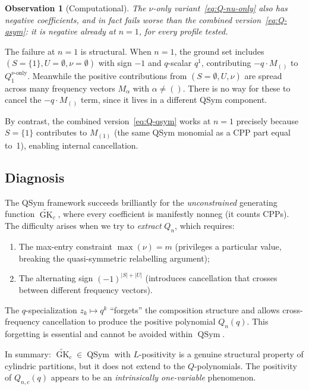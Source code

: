 \documentclass[11pt]{article}
\newtheorem{observation}[theorem]{Observation}
\newcommand{\GK}{\operatorname{GK}}
\newcommand{\QSym}{\operatorname{QSym}}
\begin{document}
\begin{observation}[Computational]\label{obs:nu-only-fails}
The $\nu$-only variant~\eqref{eq:Q-nu-only} also has negative
coefficients, and in fact fails \emph{worse} than the combined
version~\eqref{eq:Q-qsym}: it is negative already at $n = 1$,
for every profile tested.
\end{observation}

The failure at $n = 1$ is structural. When $n = 1$, the ground
set includes $(S = \{1\}, U = \emptyset, \nu = \emptyset)$
with sign $-1$ and $q$-scalar $q^1$, contributing
$-q \cdot M_{()}$ to $Q_1^{\nu\text{-only}}$. Meanwhile the
positive contributions from $(S = \emptyset, U, \nu)$ are spread
across many frequency vectors $M_\alpha$ with $\alpha \neq ()$.
There is no way for these to cancel the $-q \cdot M_{()}$ term,
since it lives in a different QSym component.

By contrast, the combined version~\eqref{eq:Q-qsym} works at
$n = 1$ precisely because $S = \{1\}$ contributes to
$M_{(1)}$ (the same QSym monomial as a CPP part equal to~1),
enabling internal cancellation.

\subsection{Diagnosis}

The QSym framework succeeds brilliantly for the \emph{unconstrained}
generating function $\widetilde{\GK}_c$, where every coefficient
is manifestly nonneg (it counts CPPs). The difficulty arises when
we try to \emph{extract} $Q_n$, which requires:
\begin{enumerate}
  \item The max-entry constraint $\max(\nu) = m$ (privileges a
    particular value, breaking the quasi-symmetric relabelling argument);
  \item The alternating sign $(-1)^{|S|+|U|}$ (introduces cancellation
    that crosses between different frequency vectors).
\end{enumerate}

The $q$-specialization $z_k \mapsto q^k$ ``forgets'' the
composition structure and allows cross-frequency cancellation to
produce the positive polynomial $Q_n(q)$. This forgetting is
essential and cannot be avoided within $\QSym$.

In summary: $\widetilde{\GK}_c \in \QSym$ with $L$-positivity
is a genuine structural property of cylindric partitions, but
it does not extend to the $Q$-polynomials. The positivity of
$Q_{n,c}(q)$ appears to be an \emph{intrinsically one-variable}
phenomenon.
\end{document}
